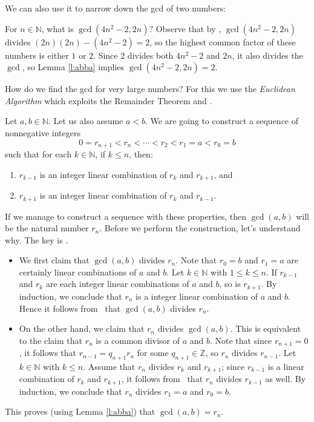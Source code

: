 \documentclass[11pt,dvipsnames]{book}
\def\Z{\mathbb{Z}}
\def\N{{\mathbb{N}}}
\numberwithin{figure}{section} %
\numberwithin{table}{section} %
\begin{document}
We can also use it to narrow down the gcd of two numbers:

\begin{example}
For $n\in\mathbb{N}$, what is $\gcd(4n^2-2,2n)?$ Observe that by \easylemma, $\gcd(4n^2-2,2n)$ divides $(2n)(2n)-(4n^2-2)=2$, so the highest common factor of these numbers is either $1$ or $2$. Since $2$ divides both $4n^2-2$ and $2n$, it also divides the $\gcd$, so Lemma \ref{l:abba} implies $\gcd(4n^2-2,2n)=2$.
\end{example}

How do we find the gcd for very large numbers? For this we use the {\it Euclidean Algorithm} which exploits the Remainder Theorem and \easylemma.

Let $a,b\in\N$. Let us also assume $a<b$.
We are going to construct a sequence of nonnegative integers
\[
0 = r_{n+1} < r_n < \cdots < r_2 < r_1 = a < r_0 = b
\]
such that for each $k \in \N$, if $k\leq n$, then:
\begin{enumerate}
    \item $r_{k-1}$ is an integer linear combination of $r_k$ and $r_{k+1}$, and
    \item $r_{k+1}$ is an integer linear combination of $r_k$ and $r_{k-1}$.
\end{enumerate}

If we manage to construct a sequence with these properties, then $\gcd(a,b)$ will be the natural number $r_n$.
Before we perform the construction, let's understand why.
The key is \easylemma.
\begin{itemize}
\item We first claim that $\gcd(a,b)$ divides $r_{n}$.
Note that $r_0=b$ and $r_1=a$ are certainly linear combinations of $a$ and $b$.
Let $k\in \N$ with $1\leq k \leq n$.
If $r_{k-1}$ and $r_k$ are each integer linear combinations of $a$ and $b$, so is $r_{k+1}$.
By induction, we conclude that $r_n$ is a integer linear combination of $a$ and $b$.
Hence it follows from \easylemma\ that $\gcd(a,b)$ divides $r_n$.
\item On the other hand, we claim that $r_{n}$ divides $\gcd(a,b)$.
This is equivalent to the claim that $r_n$ is a common divisor of $a$ and $b$.
Note that since $r_{n+1}=0$, it follows that $r_{n-1}=q_{n+1}r_{n}$ for some $q_{n+1}\in\Z$, so $r_{n}$ divides $r_{n-1}$.
Let $k\in \N$ with $k \leq n$.
Assume that $r_n$ divides $r_k$ and $r_{k+1}$; since $r_{k-1}$ is a linear combination of $r_k$ and $r_{k+1}$, it follows from \easylemma\ that $r_n$ divides $r_{k-1}$ as well.
By induction, we conclude that $r_n$ divides $r_1=a$ and $r_0=b$.
\end{itemize}
This proves (using Lemma \ref{l:abba}) that $\gcd(a,b)=r_n$.
\end{document}
